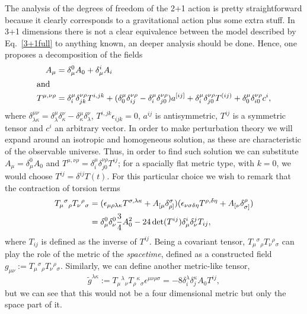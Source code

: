 \documentclass[twocolumn,
  showpacs,showkeys,prd,superscriptaddress]{revtex4-1}
\begin{document}
The  analysis of the degrees of freedom of the 2+1 action is pretty straightforward because it clearly corresponds to a gravitational action plus some extra stuff. In 3+1 dimensions there is not a clear  equivalence between the model described by Eq.~\eqref{3+1full} to anything known, an deeper  analysis should be done. Hence, one proposes a decomposition of the fields
\begin{align}
  A_\mu &= \delta_\mu^0 A_0+\delta_\mu^iA_i \\
  \intertext{and }
  T^{\mu,\nu\rho} &= \delta^{\mu}_i\delta^{\nu\rho}_{jk}T^{i,jk}+(\delta^{\mu}_0\delta^{\nu\rho}_{ij}-\delta^{\mu}_i\delta^{\nu\rho}_{j0})a^{[ij]}+\delta^{\mu}_i\delta^{\nu\rho}_{j0}T^{(ij)}+\delta^{\mu}_0\delta^{\nu\rho}_{i0}c^i,
\end{align}
where $\delta^{\mu\nu}_{\lambda\kappa}=\delta^{\mu}_{\lambda}\delta^{\nu}_{\kappa}-\delta^{\mu}_{\kappa}\delta^{\nu}_{\lambda}$, $T^{i,jk}\epsilon_{ijk}=0$, $a^{ij}$ is antisymmetric, $T^{ij}$ is a symmetric tensor and $c^i$ an arbitrary vector. In order to make perturbation theory we will expand around an isotropic and homogeneous solution, as these are characteristic of the observable universe. Thus, in order to find such solution we can substitute $A_\mu=\delta_\mu^0 A_0$ and $T^{\mu,\nu\rho}=\delta^{\mu}_i\delta^{\nu\rho}_{j0}T^{ij}$; for a spacially flat metric type, with $k=0$, we would choose $T^{ij}=\delta^{ij}T(t)$. For this particular choice we wish to remark that the contraction of torsion terms
\begin{align}
  T_{\mu}{}^{\sigma}{}_\rho T_{\nu}{}^{\rho}{}_\sigma &= (\epsilon_{\mu\rho\lambda\kappa}T^{\sigma,\lambda\kappa}+A_{[\mu}\delta^\sigma_{\rho]})(\epsilon_{\nu\sigma\delta\eta}T^{\rho,\delta\eta}+A_{[\nu}\delta^\rho_{\sigma]}) \notag \\
  &= \delta^0_\mu\delta^0_\nu\frac{3}{4} A_0^2-24\det(T^{ij})\delta^i_\mu\delta^j_\nu T_{ij},
\end{align}
where $T_{ij}$ is defined as the inverse of $T^{ij}$. Being a covariant tensor, $T_{\mu}{}^{\sigma}{}_\rho T_{\nu}{}^{\rho}{}_\sigma$ can play the role of the metric of the {\it spacetime}, defined as a constructed field $g_{\mu\nu}:= T_{\mu}{}^{\sigma}{}_\rho T_{\nu}{}^{\rho}{}_\sigma $. Similarly, we can define another metric-like tensor, 
\begin{equation}
  \tilde g^{\lambda\kappa}:= T_{\mu}{}^{\lambda}{}_\nu T_{\rho}{}^{\kappa}{}_\sigma\epsilon^{\mu\nu\rho\sigma}=-8\delta^\lambda_i\delta^\kappa_jA_0T^{ij},
\end{equation}
but we can see that this would not be a four dimensional metric but only the space part of it.
\end{document}
